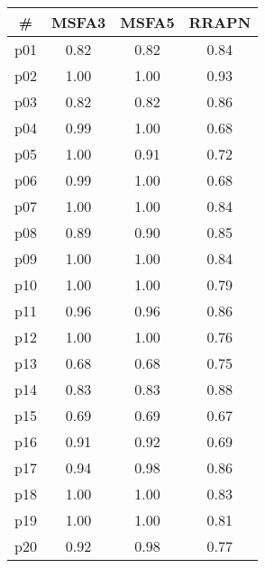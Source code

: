 \begin{tabular}{cccc}
\toprule
\textbf{\#} & \textbf{MSFA3} & \textbf{MSFA5} & \textbf{RRAPN}\\
\midrule
p01 & 0.82 & 0.82 & 0.84\\
p02 & 1.00 & 1.00 & 0.93\\
p03 & 0.82 & 0.82 & 0.86\\
p04 & 0.99 & 1.00 & 0.68\\
p05 & 1.00 & 0.91 & 0.72\\
p06 & 0.99 & 1.00 & 0.68\\
p07 & 1.00 & 1.00 & 0.84\\
p08 & 0.89 & 0.90 & 0.85\\
p09 & 1.00 & 1.00 & 0.84\\
p10 & 1.00 & 1.00 & 0.79\\
p11 & 0.96 & 0.96 & 0.86\\
p12 & 1.00 & 1.00 & 0.76\\
p13 & 0.68 & 0.68 & 0.75\\
p14 & 0.83 & 0.83 & 0.88\\
p15 & 0.69 & 0.69 & 0.67\\
p16 & 0.91 & 0.92 & 0.69\\
p17 & 0.94 & 0.98 & 0.86\\
p18 & 1.00 & 1.00 & 0.83\\
p19 & 1.00 & 1.00 & 0.81\\
p20 & 0.92 & 0.98 & 0.77\\
\bottomrule
\end{tabular}

